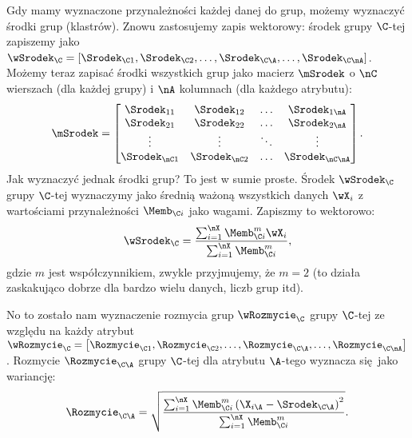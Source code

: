 \documentclass[a4paper,12pt]{article}
\begin{document}
Gdy mamy wyznaczone przynależności każdej danej do grup, możemy wyznaczyć środki grup (klastrów). Znowu zastosujemy zapis wektorowy: środek grupy $\C$-tej zapiszemy jako $\wSrodek_\C = \left[\Srodek_{\C 1}, \Srodek_{\C 2}, \ldots, \Srodek_{\C\A}, \ldots, \Srodek_{\C \nA}\right]$. Możemy teraz zapisać środki wszystkich grup jako macierz $\mSrodek$ o $\nC$ wierszach (dla każdej grupy) i $\nA$ kolumnach (dla każdego atrybutu):
\begin{align}
\mSrodek =
\left[
\begin{matrix}
\Srodek_{11} & \Srodek_{12} & \ldots & \Srodek_{1\nA} \\
\Srodek_{21} & \Srodek_{22} & \ldots & \Srodek_{2\nA} \\
\vdots  & \vdots  & \ddots & \vdots\\
\Srodek_{\nC 1} & \Srodek_{\nC 2} & \ldots & \Srodek_{\nC \nA} \\
\end{matrix}
\right]
.
\end{align}
Jak wyznaczyć jednak środki grup? To jest w sumie proste. Środek $\wSrodek_\C$ grupy $\C$-tej wyznaczymy jako średnią ważoną wszystkich danych $\wX_i$ z wartościami przynależności $\Memb_{\C i}$ jako wagami. Zapiszmy to wektorowo:
\begin{align}
\wSrodek_\C = 
\frac
{\sum_{i = 1}^{\nX} \Memb_{\C i}^m \wX_i}
{\sum_{i = 1}^{\nX} \Memb_{\C i}^m}
,
\end{align}
gdzie $m$ jest współczynnikiem, zwykle przyjmujemy, że $m = 2$ (to działa zaskakująco dobrze dla bardzo wielu danych, liczb grup itd).

No to zostało nam wyznaczenie rozmycia grup $\wRozmycie_\C$ grupy $\C$-tej ze względu na każdy atrybut $\wRozmycie_\C = \left[\Rozmycie_{\C 1}, \Rozmycie_{\C 2}, \ldots, \Rozmycie_{\C\A}, \ldots, \Rozmycie_{\C\nA}\right]$. Rozmycie $\Rozmycie_{\C\A}$ grupy $\C$-tej dla atrybutu $\A$-tego wyznacza się jako wariancję:
\begin{align}
\Rozmycie_{\C\A} = 
\sqrt{
\frac
{\sum_{i = 1}^{\nX} \Memb_{\C i}^m \left(\X_{i\A} - \Srodek_{\C\A}\right)^2}
{\sum_{i = 1}^{\nX} \Memb_{\C i}^m}
}
.
\end{align}
\end{document}
